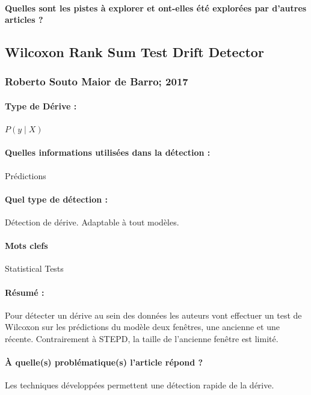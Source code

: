 \documentclass[11pt,a4paper]{report}
\begin{document}
\paragraph{Quelles sont les pistes à explorer et ont-elles  été explorées par d'autres articles ?}








\subsection{Wilcoxon Rank Sum Test Drift Detector}
\subsubsection{Roberto Souto Maior de Barro; 2017}

\paragraph{Type de Dérive :} $P(y\mid X)$
\paragraph{Quelles informations utilisées dans la détection :} Prédictions
\paragraph{Quel type de détection :} Détection de dérive. Adaptable à tout modèles.

\paragraph{Mots clefs} Statistical Tests

\paragraph{Résumé :} Pour détecter un dérive au sein des données les auteurs vont effectuer un test de Wilcoxon sur les prédictions du modèle deux fenêtres, une ancienne et une récente.
Contrairement à STEPD, la taille de l'ancienne fenêtre est limité.

\paragraph{À quelle(s) problématique(s) l'article répond ?} Les techniques développées permettent une détection rapide de la dérive. 
\end{document}
